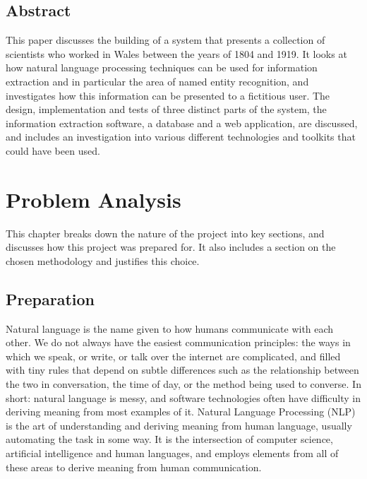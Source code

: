 \documentclass[11pt,a4paper]{book}
\begin{document}
\section*{Abstract}
This paper discusses the building of a system that presents a collection of scientists who worked in Wales between the years of 1804 and 1919. It looks at how natural language processing techniques can be used for information extraction and in particular the area of named entity recognition, and investigates how this information can be presented to a fictitious user. The design, implementation and tests of three distinct parts of the system, the information extraction software, a database and a web application, are discussed, and includes an investigation into various different technologies and toolkits that could have been used. 

\tableofcontents
\newpage
\chapter{Problem Analysis}
This chapter breaks down the nature of the project into key sections, and discusses how this project was prepared for. It also includes a section on the chosen methodology and justifies this choice.
\section{Preparation}
Natural language is the name given to how humans communicate with each other. %
We do not always have the easiest communication principles: the ways in which we speak, or write, or talk over the internet are complicated, and filled with tiny rules that depend on subtle differences such as the relationship between the two in conversation, the time of day, or the method being used to converse. In short: natural language is messy, and software technologies often have difficulty in deriving meaning from most examples of it. Natural Language Processing (NLP) is the art of understanding and deriving meaning from human language, %
usually automating the task in some way. It is the intersection of computer science, artificial intelligence and human languages, and employs elements from all of these areas to derive meaning from human communication\cite{novoseltseva_how_nodate}.
 
\end{document}
